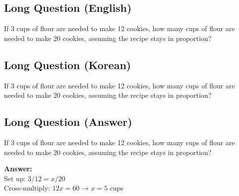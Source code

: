 \cleardoublepage
\subsection*{Long Question (English)}
If 3 cups of flour are needed to make 12 cookies, how many cups of flour are needed to make 20 cookies, assuming the recipe stays in proportion?


\newpage
\subsection*{Long Question (Korean)}
If 3 cups of flour are needed to make 12 cookies, how many cups of flour are needed to make 20 cookies, assuming the recipe stays in proportion?


\newpage
\subsection*{Long Question (Answer)}
If 3 cups of flour are needed to make 12 cookies, how many cups of flour are needed to make 20 cookies, assuming the recipe stays in proportion?

\textbf{Answer:}\\
Set up: $3/12 = x/20$\\
Cross-multiply: $12x = 60$ → $x = 5$ cups
